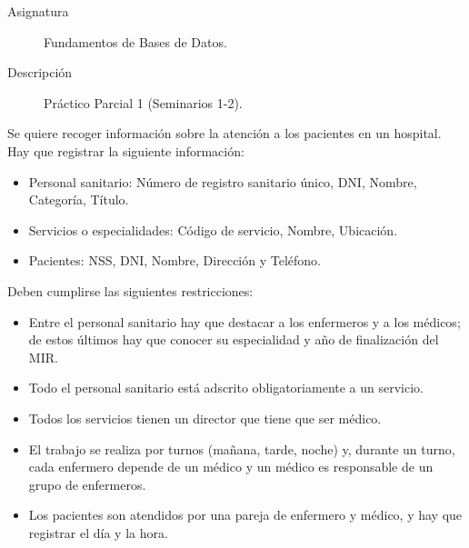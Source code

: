 \documentclass[12pt]{article}
\begin{document}

    
    

    \begin{description}
        \item[Asignatura] Fundamentos de Bases de Datos.
        \item[Descripción] Práctico Parcial 1 (Seminarios 1-2).
    
    \end{description}
    \newpage

Se quiere recoger información sobre la atención a los pacientes en un hospital. Hay que registrar la siguiente información:
\begin{itemize}
    \item Personal sanitario: Número de registro sanitario único, DNI, Nombre, Categoría, Título.
    \item Servicios o especialidades: Código de servicio, Nombre, Ubicación.
    \item Pacientes: NSS, DNI, Nombre, Dirección y Teléfono.
\end{itemize}

Deben cumplirse las siguientes restricciones:
\begin{itemize}
    \item Entre el personal sanitario hay que destacar a los enfermeros y a los médicos; de estos últimos hay que conocer su especialidad y año de finalización del MIR.
    \item Todo el personal sanitario está adscrito obligatoriamente a un servicio.
    \item Todos los servicios tienen un director que tiene que ser médico.
    \item El trabajo se realiza por turnos (mañana, tarde, noche) y, durante un turno, cada enfermero depende de un médico y un médico es responsable de un grupo de enfermeros.
    \item Los pacientes son atendidos por una pareja de enfermero y médico, y hay que registrar el día y la hora.
\end{itemize}
\end{document}
